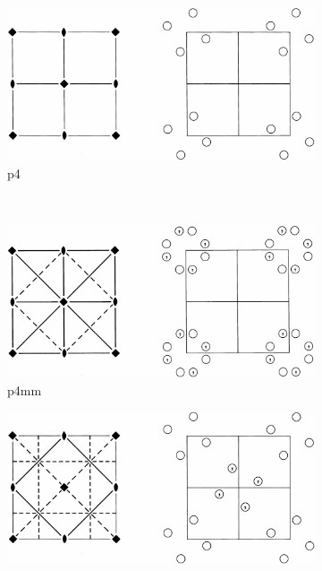 \documentclass[12pt]{article}
\begin{document}
\begin{figure}
 \centering
    \begin{subfigure}[b]{0.45\textwidth}
        \centering
        \includegraphics[width=\textwidth]{planegroups/10.png}
        \caption*{p4}
    \end{subfigure}
    ~
    \begin{subfigure}[b]{0.45\textwidth}
        \centering
        \includegraphics[width=\textwidth]{planegroups/11.png}
        \caption*{p4mm}
    \end{subfigure}
	\begin{subfigure}[b]{0.5\textwidth}
        \centering
        \includegraphics[width=\textwidth]{planegroups/12.png}

\end{subfigure}
\end{figure}
\end{document}
